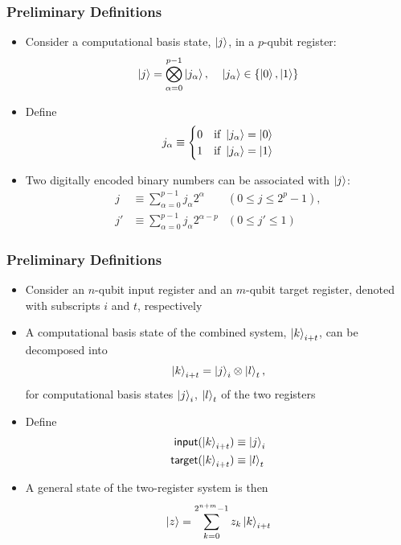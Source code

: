 \documentclass{beamer}
\begin{document}
\begin{frame}
\frametitle{Preliminary Definitions}
\begin{itemize}
\item Consider a \alert{computational basis state}, $\ket{j}$, in a $p$-qubit register:
\begin{equation}
\ket{j} = \bigotimes^{p-1}_{\alpha=0} \ket{j_\alpha}, \; \; \; \; \ket{j_\alpha} \in \{\ket{0},\ket{1} \}
\end{equation}
\item Define 
\begin{equation}
j_\alpha \equiv \begin{cases}
0 & \text{if } \ket{j_\alpha}=\ket{0} \\
1 & \text{if }  \ket{j_\alpha}=\ket{1} \\
\end{cases}
\end{equation}
\item Two \alert{digitally encoded binary numbers} can be associated with $\ket{j}$:
\begin{align}
j &\equiv \sum_{\alpha=0}^{p-1} j_\alpha 2^{\alpha} &(0 \leq j \leq 2^p-1 ), \\
j' &\equiv \sum_{\alpha=0}^{p-1} j_\alpha 2^{\alpha-p} &(0 \leq j' \leq 1)
\end{align}
\end{itemize}
\end{frame}

\begin{frame}
\frametitle{Preliminary Definitions}
\begin{itemize}
\item Consider an $n$-qubit \alert{input register} and an $m$-qubit \alert{target register}, denoted with subscripts $i$ and $t$, respectively 
\item A computational basis state of the combined system, $\ket{k}_{i+t}$, can be decomposed into
\begin{equation}
\ket{k}_{i+t} = \ket{j}_i \otimes \ket{l}_t,
\end{equation}
for computational basis states $\ket{j}_i$, $\ket{l}_t$ of the two registers
\item Define 
\begin{align}
\mathsf{input}(\ket{k}_{i+t}) &\equiv \ket{j}_i \\
\mathsf{target}(\ket{k}_{i+t}) &\equiv \ket{l}_t \\
\end{align}
\item A \alert{general state of the two-register system} is then 
\begin{equation}
\ket{z} = \sum^{2^{n+m}-1}_{k=0} z_k \ket{k}_{i+t}
\end{equation}
\end{itemize}
\end{frame}
\end{document}
